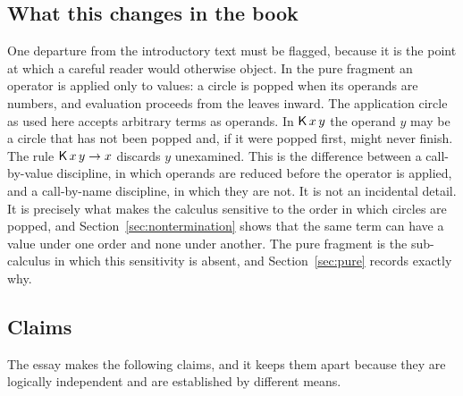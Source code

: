 \subsection{What this changes in the book}

One departure from the introductory text must be flagged, because it is the point at which a careful reader would otherwise object. In the pure fragment an operator is applied only to values: a circle is popped when its operands are numbers, and evaluation proceeds from the leaves inward. The application circle as used here accepts arbitrary terms as operands. In $\mathsf{K}\,x\,y$ the operand $y$ may be a circle that has not been popped and, if it were popped first, might never finish. The rule $\mathsf{K}\,x\,y\rightarrow x$ discards $y$ unexamined. This is the difference between a call-by-value discipline, in which operands are reduced before the operator is applied, and a call-by-name discipline, in which they are not. It is not an incidental detail. It is precisely what makes the calculus sensitive to the order in which circles are popped, and Section~\ref{sec:nontermination} shows that the same term can have a value under one order and none under another. The pure fragment is the sub-calculus in which this sensitivity is absent, and Section~\ref{sec:pure} records exactly why.

\subsection{Claims}

The essay makes the following claims, and it keeps them apart because they are logically independent and are established by different means.

